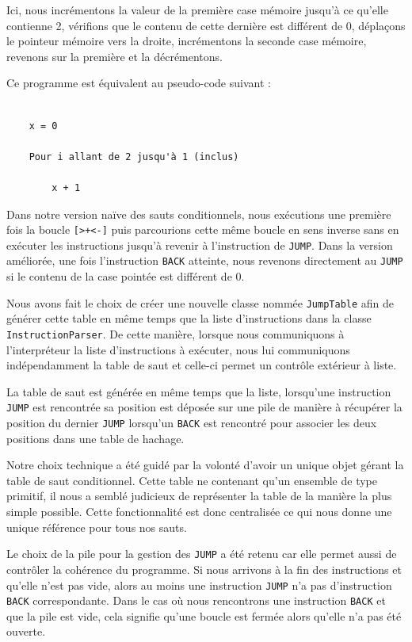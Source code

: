 \documentclass[titlepage]{article}
\begin{document}
    Ici, nous incrémentons la valeur de la première case mémoire jusqu'à ce qu'elle contienne 2, vérifions que le contenu de cette dernière est différent de 0, déplaçons le pointeur mémoire vers la droite, incrémentons la seconde case mémoire, revenons sur la première et la décrémentons.


    Ce programme est équivalent au pseudo-code suivant :

 \begin{verbatim}   

    x = 0

    Pour i allant de 2 jusqu'à 1 (inclus)

        x + 1

\end{verbatim}



    Dans notre version naïve des sauts conditionnels, nous exécutions une première fois la boucle \texttt{[>+<-]} puis parcourions cette même boucle en sens inverse sans en exécuter les instructions jusqu'à revenir à l'instruction de \texttt{JUMP}. Dans la version améliorée, une fois l'instruction \texttt{BACK} atteinte, nous revenons directement au \texttt{JUMP} si le contenu de la case pointée est différent de 0.


    Nous avons fait le choix de créer une nouvelle classe nommée \texttt{JumpTable} afin de générer cette table en même temps que la liste d'instructions dans la classe \texttt{InstructionParser}. De cette manière, lorsque nous communiquons à l'interpréteur la liste d'instructions à exécuter, nous lui communiquons indépendamment la table de saut et celle-ci permet un contrôle extérieur à liste.


    La table de saut est générée en même temps que la liste, lorsqu'une instruction \texttt{JUMP} est rencontrée sa position est déposée sur une pile de manière à récupérer la position du dernier \texttt{JUMP} lorsqu'un \texttt{BACK} est rencontré pour associer les deux positions dans une table de hachage.



    Notre choix technique a été guidé par la volonté d'avoir un unique objet gérant la table de saut conditionnel. Cette table ne contenant qu'un ensemble de type primitif, il nous a semblé judicieux de représenter la table de la manière la plus simple possible. Cette fonctionnalité est donc centralisée ce qui nous donne une unique référence pour tous nos sauts.


    Le choix de la pile pour la gestion des \texttt{JUMP} a été retenu car elle permet aussi de contrôler la cohérence du programme. Si nous arrivons à la fin des instructions et qu'elle n'est pas vide, alors au moins une instruction \texttt{JUMP} n'a pas d'instruction \texttt{BACK} correspondante. Dans le cas où nous rencontrons une instruction \texttt{BACK} et que la pile est vide, cela signifie qu'une boucle est fermée alors qu'elle n'a pas été ouverte.
\end{document}
